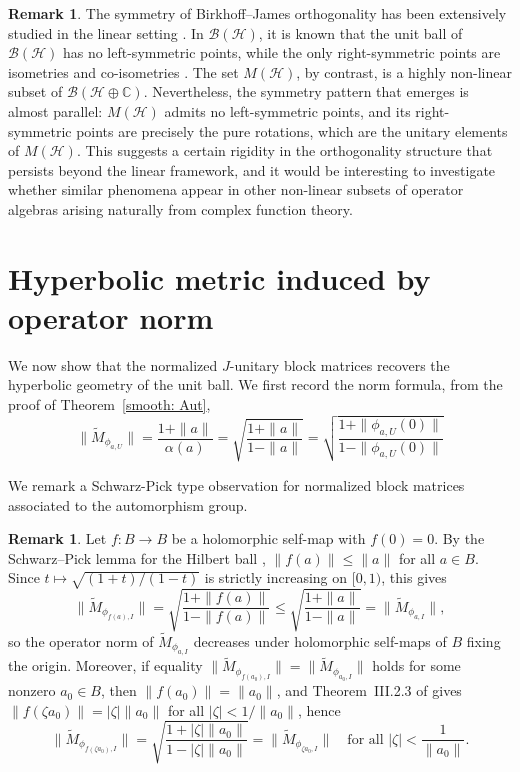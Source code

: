 \documentclass[12pt]{amsart}
\theoremstyle{definition}
\newtheorem{remark}[theorem]{Remark}
\newcommand{\B}{\mathcal{B}}
\renewcommand{\H}{\mathcal{H}}
\begin{document}
\begin{remark}
The symmetry of Birkhoff--James orthogonality has been extensively 
studied in the linear setting \cite{Mal-Paul-Sain-book, Sain-2017, Sain-normattain}. In $\mathcal{B}(\mathcal{H})$, it is known that the unit ball of $\B(\H)$ has no left-symmetric points, while the only right-symmetric points are isometries and co-isometries \cite{Turnsek, Komuro-Saito-Tanaka}. The set $M(\mathcal{H})$, 
by contrast, is a highly non-linear subset of $\mathcal{B}(\mathcal{H}\oplus\mathbb{C})$. Nevertheless, the symmetry pattern that emerges 
is almost parallel: $M(\mathcal{H})$ admits no left-symmetric 
points, and its right-symmetric points are precisely the pure rotations, 
which are the unitary elements of $M(\mathcal{H})$. This suggests a certain rigidity in the orthogonality structure that persists beyond the linear framework, and it would be interesting to investigate whether similar phenomena appear in other non-linear 
subsets of operator algebras arising naturally from complex function 
theory.
\end{remark}



\section{Hyperbolic metric induced by operator norm}\label{section:Hyperbolic metric}




\noindent We now show that the normalized $J$-unitary block matrices
recovers the hyperbolic geometry of the unit ball. We first record the norm formula, from the proof of Theorem~\ref{smooth: Aut},
\begin{equation}\label{Eqn:norm}
\|\widetilde{M}_{\phi_{a,U}}\| = \frac{1+\|a\|}{\alpha(a)} = \sqrt{\frac{1+\|a\|}{1-\|a\|}}=\sqrt{\frac{1+\|\phi_{a,U}(0)\|}{1-\|\phi_{a,U}(0)\|}}
\end{equation}

\noindent We remark a Schwarz-Pick type observation for normalized block matrices associated to the automorphism group.
\begin{remark}
Let $f\colon B\to B$ be a holomorphic self-map with $f(0)=0$. By the
Schwarz--Pick lemma for the Hilbert ball \cite{Goebel-Reich}, $\|f(a)\|
\leq\|a\|$ for all $a\in B$. Since $t\mapsto\sqrt{(1+t)/(1-t)}$ is
strictly increasing on $[0,1)$, this gives
\[
\|\widetilde{M}_{\phi_{f(a),I}}\|
= \sqrt{\frac{1+\|f(a)\|}{1-\|f(a)\|}}
\leq \sqrt{\frac{1+\|a\|}{1-\|a\|}}
= \|\widetilde{M}_{\phi_{a,I}}\|,
\]
so the operator norm of $\widetilde{M}_{\phi_{a,I}}$ decreases under
holomorphic self-maps of $B$ fixing the origin. Moreover, if equality
$\|\widetilde{M}_{\phi_{f(a_0),I}}\| = \|\widetilde{M}_{\phi_{a_0,I}}\|$
holds for some nonzero $a_0\in B$, then $\|f(a_0)\|=\|a_0\|$, and
Theorem~III.2.3 of \cite{FV} gives $\|f(\zeta a_0)\|=|\zeta|\|a_0\|$
for all $|\zeta|<1/\|a_0\|$, hence
\[
\|\widetilde{M}_{\phi_{f(\zeta a_0),I}}\|
= \sqrt{\frac{1+|\zeta|\|a_0\|}{1-|\zeta|\|a_0\|}}
= \|\widetilde{M}_{\phi_{\zeta a_0,I}}\|
\quad\text{for all } |\zeta| < \frac{1}{\|a_0\|}.
\]
\end{remark}
\end{document}
